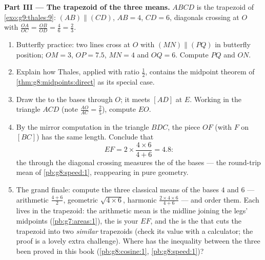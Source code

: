 \begin{problem}
\medskip
\noindent\textbf{Part III --- The trapezoid of the three
means.}
$ABCD$ is the trapezoid of \cref{exo:g9:thales:9}:
$(AB) \parallel (CD)$, $AB = 4$, $CD = 6$, diagonals crossing at
$O$ with $\frac{OA}{OC} = \frac{OB}{OD} = \frac{4}{6} =
\frac23$.
\begin{enumerate}[resume]
  \item Butterfly practice: two lines cross at $O$ with
        $(MN) \parallel (PQ)$ in butterfly position; $OM = 3$,
        $OP = 7.5$, $MN = 4$ and $OQ = 6$. Compute $PQ$ and
        $ON$.
  \item Explain how Thales, applied with ratio $\frac12$,
        contains the midpoint theorem of
        \cref{thm:g8:midpoints:direct} as its special case.
  \item Draw the  to the bases through $O$; it meets
        $[AD]$ at $E$. Working in the triangle $ACD$ (note
        $\frac{AO}{AC} = \frac25$), compute $EO$.
  \item By the mirror computation in the triangle $BDC$, the
        piece $OF$ (with $F$ on $[BC]$) has the same length.
        Conclude that
        \[
        EF = 2 \times \frac{4 \times 6}{4 + 6} = 4.8 :
        \]
        the  through the diagonal crossing measures the
        \emph{} of the bases --- the round-trip
        mean of \cref{pb:g8:speed:1}, reappearing in pure
        geometry.
  \item The grand finale: compute the three classical means of
        the bases $4$ and $6$ --- arithmetic
        $\frac{4+6}{2}$, geometric $\sqrt{4 \times 6}$, harmonic
        $\frac{2 \times 4 \times 6}{4 + 6}$ --- and order them.
        Each lives in the trapezoid: the arithmetic mean is the
        midline joining the legs' midpoints
        (\cref{pb:g7:areas:1}), the  is your
         $EF$, and the  is the 
        that cuts the trapezoid into two \emph{similar}
        trapezoids (check its value with a calculator; the
        proof is a lovely extra challenge). Where has the
        inequality between the three been proved in this book
        (\cref{pb:g8:cosine:1}, \cref{pb:g8:speed:1})?
\end{enumerate}
\end{problem}

